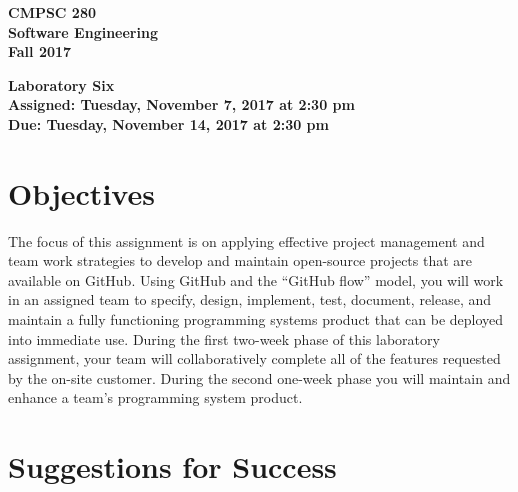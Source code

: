 \documentclass[11pt]{article}
\newcommand{\assignmentduedate}{November 14}
\newcommand{\assignmentassignedate}{November 7}
\newcommand{\assignmentnumber}{Six}
\newcommand{\labyear}{2017}
\newcommand{\labday}{Tuesday}
\newcommand{\labtime}{2:30 pm}
\newcommand{\assigneddate}{Assigned: \labday, \assignmentassignedate, \labyear{} at \labtime{}}
\newcommand{\duedate}{Due: \labday, \assignmentduedate, \labyear{} at \labtime{}}
\newcommand{\labtitle}[1]
{
  \begin{center}
    \begin{center}
      \bf
      CMPSC 280\\Software Engineering\\
      Fall 2017\\
      \medskip
    \end{center}
    \bf
    #1
  \end{center}
}
\begin{document}
\thispagestyle{empty}

\labtitle{Laboratory \assignmentnumber{} \\ \assigneddate{} \\ \duedate{}}

\section*{Objectives}

The focus of this assignment is on applying effective project management and team work strategies to develop and
maintain open-source projects that are available on GitHub. Using GitHub and the ``GitHub flow'' model, you will work in
an assigned team to specify, design, implement, test, document, release, and maintain a fully functioning programming
systems product that can be deployed into immediate use. During the first two-week phase of this laboratory assignment,
your team will collaboratively complete all of the features requested by the on-site customer. During the second
one-week phase you will maintain and enhance a team's programming system product.

\section*{Suggestions for Success}
\end{document}
